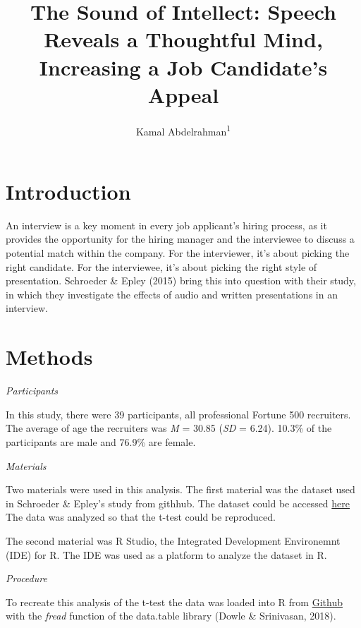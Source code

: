 \documentclass[man]{apa6}
\title{The Sound of Intellect: Speech Reveals a Thoughtful Mind, Increasing a Job Candidate's Appeal}
\author{Kamal Abdelrahman\textsuperscript{1}}
\date{}
\affiliation{
\vspace{0.5cm}
\textsuperscript{1} City University of New York - Brooklyn College}
\begin{document}
\maketitle

\hypertarget{introduction}{%
\section{Introduction}\label{introduction}}

An interview is a key moment in every job applicant's hiring process, as it provides the opportunity for the hiring manager and the interviewee to discuss a potential match within the company. For the interviewer, it's about picking the right candidate. For the interviewee, it's about picking the right style of presentation. Schroeder \& Epley (2015) bring this into question with their study, in which they investigate the effects of audio and written presentations in an interview.

\hypertarget{methods}{%
\section{Methods}\label{methods}}

\emph{Participants}

In this study, there were 39 participants, all professional Fortune 500 recruiters. The average of age the recruiters was \emph{M} = 30.85 (\emph{SD} = 6.24). 10.3\% of the participants are male and 76.9\% are female.

\emph{Materials}

Two materials were used in this analysis. The first material was the dataset used in Schroeder \& Epley's study from githhub. The dataset could be accessed \href{\%22https://raw.githubusercontent.com/CrumpLab/statisticsLab/master/data/SchroederEpley2015data.csv\%22}{here} The data was analyzed so that the t-test could be reproduced.

The second material was R Studio, the Integrated Development Environemnt (IDE) for R. The IDE was used as a platform to analyze the dataset in R.

\newpage

\emph{Procedure}

To recreate this analysis of the t-test the data was loaded into R from \href{\%22https://raw.githubusercontent.com/CrumpLab/statisticsLab/master/data/SchroederEpley2015data.csv\%22}{Github} with the \emph{fread} function of the data.table library (Dowle \& Srinivasan, 2018).
\end{document}

